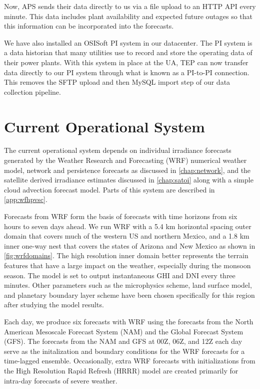 Now, APS sends their data directly to us via a file upload to an HTTP
API every minute.
This data includes plant availability and expected future outages so
that this information can be incorporated into the forecasts.

We have also installed an OSISoft PI system in our datacenter.
The PI system is a data historian that many utilities use to record
and store the operating data of their power plants.
With this system in place at the UA, TEP can now transfer data
directly to our PI system through what is known as a PI-to-PI
connection.
This removes the SFTP upload and then MySQL import step of our data
collection pipeline.

\section{Current Operational System}
\label{sec:opsys}

The current operational system depends on individual irradiance forecasts
generated by the Weather Research and Forecasting (WRF) numerical
weather model, network and persistence forecasts as discussed in
\cref{chap:network}, and the satellite derived irradiance estimates
discussed in \cref{chap:satoi} along with a simple cloud advection
forecast model.
Parts of this system are described in \cref{app:wfhpvsc}.

Forecasts from WRF form the basis of forecasts with time horizons from
six hours to seven days ahead.
We run WRF with a 5.4 km horizontal spacing outer domain that covers
much of the western US and northern Mexico, and a 1.8 km inner one-way
nest that covers the states of Arizona and New Mexico as shown in
\cref{fig:wrfdomains}.
The high resolution inner domain better represents the terrain
features that have a large impact on the weather, especially during
the monsoon season.
The model is set to output instantaneous GHI and DNI every three minutes.
Other parameters such as the microphysics scheme, land surface model,
and planetary boundary layer scheme have been chosen specifically for
this region after studying the model results.

Each day, we produce six forecasts with WRF using the forecasts from
the North American Mesoscale Forecast System (NAM) and the Global
Forecast System (GFS).
The forecasts from the NAM and GFS at 00Z, 06Z, and 12Z each day serve
as the initalization and boundary conditions for the WRF forecasts for
a time-lagged ensemble.
Occasionally, extra WRF forecasts with initializations from the High
Resolution Rapid Refresh (HRRR) model are created primarily for
intra-day forecasts of severe weather.

